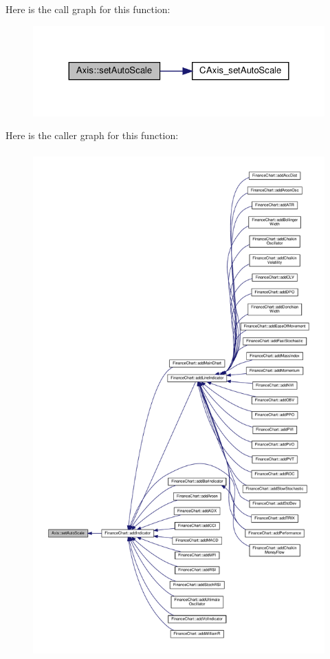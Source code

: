 Here is the call graph for this function\+:
\nopagebreak
\begin{figure}[H]
\begin{center}
\leavevmode
\includegraphics[width=324pt]{class_axis_a1be77ee03032a57d8a032fa118821b74_cgraph}
\end{center}
\end{figure}
Here is the caller graph for this function\+:
\nopagebreak
\begin{figure}[H]
\begin{center}
\leavevmode
\includegraphics[height=550pt]{class_axis_a1be77ee03032a57d8a032fa118821b74_icgraph}
\end{center}
\end{figure}
\mbox{\label{class_axis_a54d88ba3d4791b92a3efb757b3ea5c48}} 
